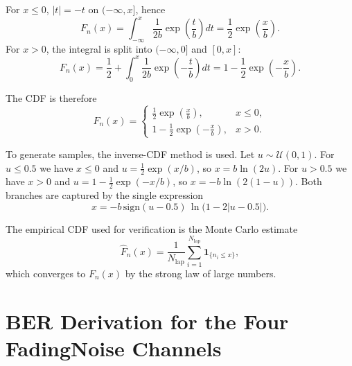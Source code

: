 \documentclass[12pt,a4paper]{article}
\begin{document}
For $x\le 0$, $|t|=-t$ on $(-\infty,x]$, hence
\begin{equation}
    F_n(x)=\int_{-\infty}^{x}\frac{1}{2b}\exp\!\left(\frac{t}{b}\right)dt
          =\frac{1}{2}\exp\!\left(\frac{x}{b}\right).
\end{equation}
For $x>0$, the integral is split into $(-\infty,0]$ and $[0,x]$:
\begin{equation}
    F_n(x)=\frac{1}{2}+\int_{0}^{x}\frac{1}{2b}\exp\!\left(-\frac{t}{b}\right)dt
          =1-\frac{1}{2}\exp\!\left(-\frac{x}{b}\right).
\end{equation}

The CDF is therefore
\begin{equation}
    F_n(x)=
    \begin{cases}
        \frac{1}{2}\exp\!\left(\frac{x}{b}\right), & x\le 0,\\[0.5em]
        1-\frac{1}{2}\exp\!\left(-\frac{x}{b}\right), & x>0.
    \end{cases}
\end{equation}

To generate samples, the inverse-CDF method is used. Let $u\sim\mathcal{U}(0,1)$. For $u\le 0.5$ we have $x\le 0$ and $u=\frac{1}{2}\exp(x/b)$, so $x=b\ln(2u)$. For $u>0.5$ we have $x>0$ and $u=1-\frac{1}{2}\exp(-x/b)$, so $x=-b\ln(2(1-u))$. Both branches are captured by the single expression
\begin{equation}
    x=-b\,\mathrm{sign}(u-0.5)\,\ln\bigl(1-2|u-0.5|\bigr).
\end{equation}

The empirical CDF used for verification is the Monte Carlo estimate
\begin{equation}
    \hat{F}_n(x)=\frac{1}{N_{\text{lap}}}\sum_{i=1}^{N_{\text{lap}}}\mathbf{1}_{\{n_i\le x\}},
\end{equation}
which converges to $F_n(x)$ by the strong law of large numbers.

\section{BER Derivation for the Four Fading\/Noise Channels}\label{app:ber}

\end{document}
